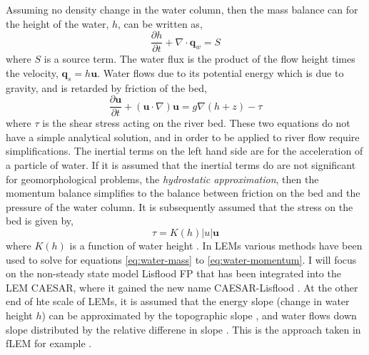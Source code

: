 Assuming no density change in the water column, then the mass balance can for the height of the water, $h$, can be written as,
\begin{equation}
\frac{\partial h}{\partial t} + \nabla \cdot \mathbf{q}_{w} = S
\label{eq:water-mass}
\end{equation}
where $S$ is a source term. The water flux is the product of the flow height times the velocity, $\mathbf{q}_{s} = h\mathbf{u}$. Water flows due to its potential energy which is due to gravity, and is retarded by friction of the bed,
\begin{equation}
\frac{\partial \mathbf{u}}{\partial t} + \left( \mathbf{u} \cdot \nabla \right) \mathbf{u} = g \nabla\left( h + z \right) - \tau
\end{equation}
where $\tau$ is the shear stress acting on the river bed. These two equations do not have a simple analytical solution, and in order to be applied to river flow require simplifications. The inertial terms on the left hand side are for the acceleration of a particle of water. If it is assumed that the inertial terms do are not significant for geomorphological problems, the \emph{hydrostatic approximation}, then the momentum balance simplifies to the balance between friction on the bed and the pressure of the water column. It is subsequently assumed that the stress on the bed is given by,
\begin{equation}
\tau = K(h)|u|\mathbf{u}
\label{eq:water-momentum}
\end{equation}
where $K(h)$ is a function of water height \citep{manning-1981}. In LEMs various methods have been used to solve for equations \ref{eq:water-mass} to \ref{eq:water-momentum}. I will focus on the non-steady state model Lisflood FP \citep{bates-2000} that has been integrated into the LEM CAESAR, where it gained the new name CAESAR-Lisflood \citep{coulthard-etal-2013}. At the other end of hte scale of LEMs, it is assumed that the energy slope (change in water height $h$) can be approximated by the topographic slope \citep[e.g.][]{schoorl-etal-2000,armitage-2019}, and water flows down slope distributed by the relative differene in slope \citep[e.g.][]{schoorl-etal-2000,armitage-2019}. This is the approach taken in fLEM for example \citep{armitage-2019}.

